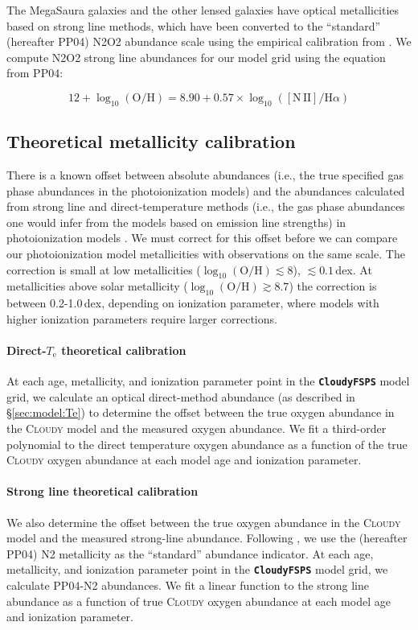 \documentclass[preprint2]{aastex62}
\newcommand{\CloudyFSPS}{{\tt \textbf{CloudyFSPS}}\xspace}
\newcommand{\Cloudy}{\textsc{Cloudy}\xspace}
\newcommand{\logten}{\ensuremath{\log_{10}}}
\newcommand{\logOH}{\ensuremath{\logten (\mathrm{O}/\mathrm{H})}\xspace}
\newcommand{\mage}{{\sc Meg}a{\sc S}a{\sc ura}\xspace}
\newcommand{\Te}{\ensuremath{T_{\mathrm{e}}}\xspace}
\begin{document}
The \mage galaxies and the other lensed galaxies  have optical metallicities based on strong line methods, which have been converted to the ``standard'' \citet{Pettini+2004} (hereafter PP04) N2O2 abundance scale using the empirical calibration from \citet{Kewley+2008}. We compute N2O2 strong line abundances for our model grid using the equation from PP04:

\begin{equation}
12 + \logOH = 8.90 + 0.57 \times \log_{10}(\mathrm{[N\,II]}/\mathrm{H}\alpha)
\end{equation}


\subsection{Theoretical metallicity calibration}\label{sec:model:corr}

There is a known offset between absolute abundances (i.e., the true specified gas phase abundances in the photoionization models) and the abundances calculated from strong line and direct-temperature methods (i.e., the gas phase abundances one would infer from the models based on emission line strengths) in photoionization models \citep{Kewley+2008}. We must correct for this offset before we can compare our photoionization model metallicities with observations on the same scale. The correction is small at low metallicities (\logOH$ \lesssim 8$), $\lesssim 0.1$\,dex. At metallicities above solar metallicity (\logOH$\gtrsim 8.7$) the correction is between 0.2-1.0\,dex, depending on ionization parameter, where models with higher ionization parameters require larger corrections.

\paragraph{Direct-\Te theoretical calibration} At each age, metallicity, and ionization parameter point in the \CloudyFSPS model grid, we calculate an optical direct-method abundance (as described in \S\ref{sec:model:Te}) to determine the offset between the true oxygen abundance in the \Cloudy model and the measured oxygen abundance. We fit a third-order polynomial to the direct temperature oxygen abundance as a function of the true \Cloudy oxygen abundance at each model age and ionization parameter.

\paragraph{Strong line theoretical calibration} We also determine the offset between the true oxygen abundance in the \Cloudy model and the measured strong-line abundance. Following \citet{Kewley+2008}, we use the \citet{Pettini+2004} (hereafter PP04) N2 metallicity as the ``standard'' abundance indicator. At each age, metallicity, and ionization parameter point in the \CloudyFSPS model grid, we calculate PP04-N2 abundances. We fit a linear function to the strong line abundance as a function of true \Cloudy oxygen abundance at each model age and ionization parameter.
\end{document}
